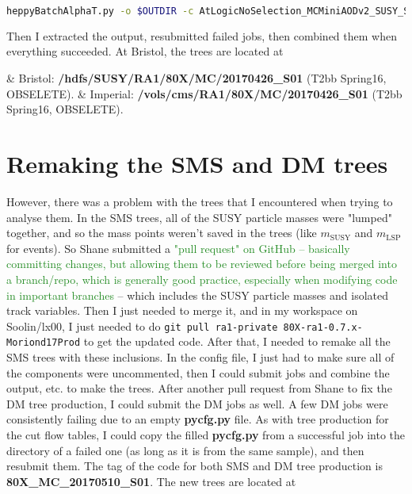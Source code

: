 \begin{lstlisting}[belowskip=-0.7cm, language=sh, numbers=none]
heppyBatchAlphaT.py -o $OUTDIR -c AtLogicNoSelection_MCMiniAODv2_SUSY_SMS_FastSim
\end{lstlisting}

Then I extracted the output, resubmitted failed jobs, then combined them when everything succeeded. At Bristol, the trees are located at

\begin{easylist}
\easylistprops
& Bristol: \textbf{/hdfs/SUSY/RA1/80X/MC/20170426\_S01} (T2bb Spring16, OBSELETE).
& Imperial: \textbf{/vols/cms/RA1/80X/MC/20170426\_S01} (T2bb Spring16, OBSELETE).
\end{easylist}


\section{Remaking the SMS and DM trees}

However, there was a problem with the trees that I encountered when trying to analyse them. In the SMS trees, all of the SUSY particle masses were "lumped" together, and so the mass points weren't saved in the trees (like $m_{\mathrm{SUSY}}$ and $m_{\mathrm{LSP}}$ for events). So Shane submitted a \textcolor{ForestGreen}{"pull request" on GitHub -- basically committing changes, but allowing them to be reviewed before being merged into a branch/repo, which is generally good practice, especially when modifying code in important branches} -- which includes the SUSY particle masses and isolated track variables. Then I just needed to merge it, and in my workspace on Soolin/lx00, I just needed to do \texttt{git pull ra1-private 80X-ra1-0.7.x-Moriond17Prod} to get the updated code. After that, I needed to remake all the SMS trees with these inclusions. In the config file, I just had to make sure all of the components were uncommented, then I could submit jobs and combine the output, etc. to make the trees. After another pull request from Shane to fix the DM tree production, I could submit the DM jobs as well. A few DM jobs were consistently failing due to an empty \textbf{pycfg.py} file. As with tree production for the cut flow tables, I could copy the filled \textbf{pycfg.py} from a successful job into the directory of a failed one (as long as it is from the same sample), and then resubmit them. The tag of the code for both SMS and DM tree production is \textbf{80X\_MC\_20170510\_S01}. The new trees are located at

